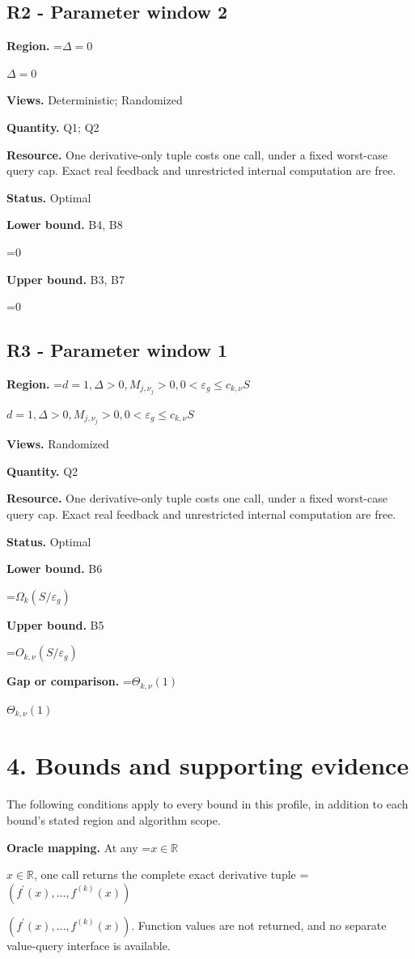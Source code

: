 \documentclass[10pt,a4paper]{article}
\newcommand{\AtlasMath}[1]{\par\begingroup\centering\setbox0=\hbox{$\displaystyle #1$}\ifdim\wd0>1.4\linewidth\typeout{ATLAS WIDE FORMULA: \the\wd0}\fi\ifdim\wd0>\linewidth\resizebox{\linewidth}{!}{\box0}\else\box0\fi\par\endgroup}
\newcommand{\AtlasInlineMath}[1]{\begingroup\setbox0=\hbox{$#1$}\ifdim\wd0>.4\linewidth\endgroup\AtlasMath{#1}\else\endgroup$#1$\fi}
\begin{document}
\subsection{R2 - Parameter window 2}
\textbf{Region.} \AtlasInlineMath{\Delta=0}

\textbf{Views.} Deterministic; Randomized

\textbf{Quantity.} Q1; Q2

\textbf{Resource.} One derivative-only tuple costs one call, under a fixed worst-case query cap. Exact real feedback and unrestricted internal computation are free.

\textbf{Status.} Optimal

\textbf{Lower bound.} B4, B8

\AtlasMath{0}
\textbf{Upper bound.} B3, B7

\AtlasMath{0}
\subsection{R3 - Parameter window 1}
\textbf{Region.} \AtlasInlineMath{d=1,\Delta>0,M_{j,\nu_j}>0,0<\varepsilon_g\le c_{k,\nu}S}

\textbf{Views.} Randomized

\textbf{Quantity.} Q2

\textbf{Resource.} One derivative-only tuple costs one call, under a fixed worst-case query cap. Exact real feedback and unrestricted internal computation are free.

\textbf{Status.} Optimal

\textbf{Lower bound.} B6

\AtlasMath{\Omega_k(S/\varepsilon_g)}
\textbf{Upper bound.} B5

\AtlasMath{O_{k,\nu}(S/\varepsilon_g)}
\textbf{Gap or comparison.} \AtlasInlineMath{\Theta_{k,\nu}(1)}

\section{4. Bounds and supporting evidence}
The following conditions apply to every bound in this profile, in addition to each bound's stated region and algorithm scope.

\textbf{Oracle mapping.} At any \AtlasInlineMath{x\in\mathbb{R}}, one call returns the complete exact derivative tuple \AtlasInlineMath{(f^{\prime}(x),\ldots,f^{(k)}(x))}. Function values are not returned, and no separate value-query interface is available.
\end{document}

